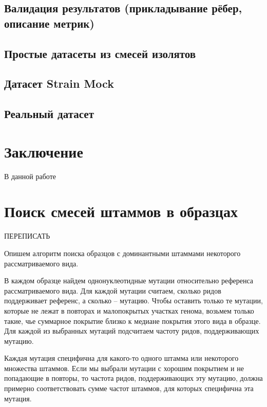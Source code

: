 \documentclass{spbau-diploma}
\begin{document}
\subsection{Валидация результатов (прикладывание рёбер, описание метрик)}
\subsection{Простые датасеты из смесей изолятов}
\subsection{Датасет Strain Mock}
\subsection{Реальный датасет} \label{infant_gut_section}







\section*{Заключение}
В данной работе 









\appendix

\section{Поиск смесей штаммов в образцах}\label{dominated_samples}

ПЕРЕПИСАТЬ

Опишем алгоритм поиска образцов с доминантными штаммами некоторого рассматриваемого вида. 

В каждом образце найдем однонуклеотидные мутации относительно референса рассматриваемого вида. Для каждой мутации считаем, сколько ридов поддерживает референс, а сколько – мутацию. Чтобы оставить только те мутации, которые не лежат в повторах и малопокрытых участках генома, возьмем только такие, чье суммарное покрытие близко к медиане покрытия этого вида в образце. Для каждой из выбранных мутаций подсчитаем частоту ридов, поддерживающих мутацию.

Каждая мутация специфична для какого-то одного штамма или некоторого множества штаммов. Если мы выбрали мутации с хорошим покрытием и не попадающие в повторы, то частота ридов, поддерживающих эту мутацию, должна примерно соответствовать сумме частот штаммов, для которых специфична эта мутация.
\end{document}

